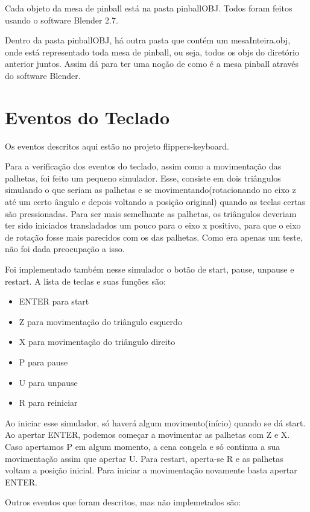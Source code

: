 \documentclass[a4paper,12pt]{article}
\begin{document}
Cada objeto da mesa de pinball está na pasta pinballOBJ. Todos foram feitos usando o software Blender 2.7.

Dentro da pasta pinballOBJ, há outra pasta que contém um mesaInteira.obj, onde está representado toda mesa de pinball, ou seja, todos os objs do diretório anterior juntos. Assim dá
para ter uma noção de como é a mesa pinball através do software Blender.

\section{Eventos do Teclado}
\mbox{}

Os eventos descritos aqui estão no projeto flippers-keyboard.

Para a verificação dos eventos do teclado, assim como a movimentação das palhetas, foi feito um pequeno simulador. Esse, consiste em dois triângulos simulando o que seriam as palhetas e se 
movimentando(rotacionando no eixo z até um certo ângulo e depois voltando a posição original) quando as teclas certas são pressionadas. Para ser mais semelhante as palhetas, os triângulos
deveriam ter sido iniciados transladados um pouco para o eixo x positivo, para que o eixo de rotação fosse mais parecidos com os das palhetas. Como era apenas um teste, não foi dada 
preocupação a isso.

Foi implementado também nesse simulador o botão de start, pause, unpause e restart. A lista de teclas e suas funções são:

\begin{itemize}
\item ENTER para start
\item Z para movimentação do triângulo esquerdo
\item X para movimentação do triângulo direito
\item P para pause
\item U para unpause
\item R para reiniciar
\end{itemize}

Ao iniciar esse simulador, só haverá algum movimento(início) quando se dá start. Ao apertar ENTER, podemos começar a movimentar as palhetas com Z e X. Caso apertamos P em algum momento, 
a cena congela e só continua a sua movimentação assim que apertar U. Para restart, aperta-se R e as palhetas voltam a posição inicial. Para iniciar a movimentação novamente basta apertar 
ENTER.

Outros eventos que foram descritos, mas não implemetados são:
\end{document}
